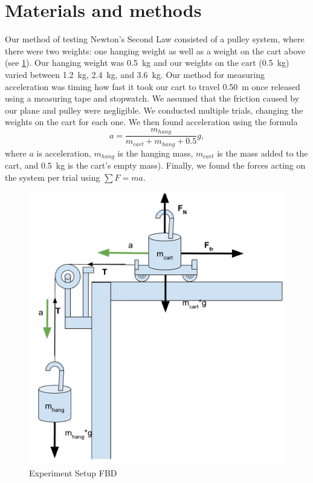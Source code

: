 ﻿\documentclass[reprint,amsmath,amssymb,aps]{revtex4-2}
\begin{document}
\section{Materials and methods}
Our method of testing Newton’s Second Law consisted of a pulley system, where there were two weights: one hanging weight as well as a weight on the cart above (see \cref{fig:1}). Our hanging weight was \qty{0.5}{\kilo\gram} and our weights on the cart (\qty{0.5}{\kilo\gram}) varied between \qty{1.2}{\kilo\gram}, \qty{2.4}{\kilo\gram}, and \qty{3.6}{\kilo\gram}. Our method for measuring acceleration was timing how fast it took our cart to travel \qty{0.50}{\meter} once released using a measuring tape and stopwatch. We assumed that the friction caused by our plane and pulley were negligible. We conducted multiple trials, changing the weights on the cart for each one. We then found acceleration using the formula
\begin{equation}
a = \dfrac{m_{hang}}{m_{cart}+m_{hang}+0.5} g,
\label{eq:apred}
\end{equation}
where $a$ is acceleration, $m_{hang}$ is the hanging mass, $m_{cart}$ is the mass added to the cart, and \qty{0.5}{\kilo\gram} is the cart's empty mass). Finally, we found the forces acting on the system per trial using $\sum F = ma$.

\begin{figure}
\begin{center}
\includegraphics[width=0.66\columnwidth]{fig1.png}
\end{center}
\caption{Experiment Setup FBD}
\label{fig:1}
\end{figure}
\end{document}
